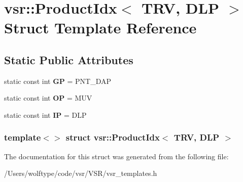 \hypertarget{structvsr_1_1_product_idx_3_01_t_r_v_00_01_d_l_p_01_4}{\section{vsr\-:\-:Product\-Idx$<$ T\-R\-V, D\-L\-P $>$ Struct Template Reference}
\label{structvsr_1_1_product_idx_3_01_t_r_v_00_01_d_l_p_01_4}
}
\subsection*{Static Public Attributes}
\begin{DoxyCompactItemize}
\item 
\hypertarget{structvsr_1_1_product_idx_3_01_t_r_v_00_01_d_l_p_01_4_a8e7608bde6adba0dae3d01c67a0580b0}{static const int {\bfseries G\-P} = P\-N\-T\-\_\-\-D\-A\-P}\label{structvsr_1_1_product_idx_3_01_t_r_v_00_01_d_l_p_01_4_a8e7608bde6adba0dae3d01c67a0580b0}

\item 
\hypertarget{structvsr_1_1_product_idx_3_01_t_r_v_00_01_d_l_p_01_4_a91c76ed36f1e78c43f933c13b5ed5740}{static const int {\bfseries O\-P} = M\-U\-V}\label{structvsr_1_1_product_idx_3_01_t_r_v_00_01_d_l_p_01_4_a91c76ed36f1e78c43f933c13b5ed5740}

\item 
\hypertarget{structvsr_1_1_product_idx_3_01_t_r_v_00_01_d_l_p_01_4_a00364b1f5d20da008296065b9f105037}{static const int {\bfseries I\-P} = D\-L\-P}\label{structvsr_1_1_product_idx_3_01_t_r_v_00_01_d_l_p_01_4_a00364b1f5d20da008296065b9f105037}

\end{DoxyCompactItemize}
\subsubsection*{template$<$$>$ struct vsr\-::\-Product\-Idx$<$ T\-R\-V, D\-L\-P $>$}



The documentation for this struct was generated from the following file\-:\begin{DoxyCompactItemize}
\item 
/\-Users/wolftype/code/vsr/\-V\-S\-R/vsr\-\_\-templates.\-h\end{DoxyCompactItemize}
